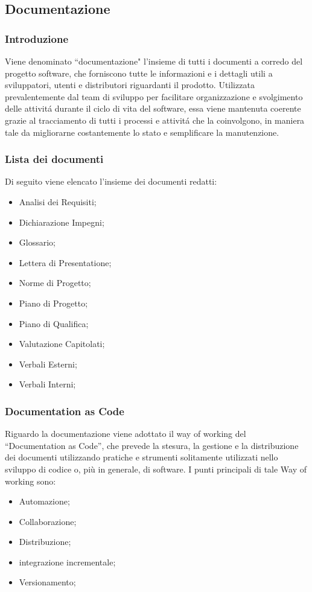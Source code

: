 \subsection{Documentazione}
\subsubsection{Introduzione}
Viene denominato ``documentazione" l'insieme di tutti i documenti a corredo del progetto software, che forniscono tutte le informazioni e i dettagli utili a sviluppatori, utenti e distributori riguardanti il prodotto. Utilizzata prevalentemente dal team di sviluppo per facilitare organizzazione e svolgimento delle attivitá durante il ciclo di vita del software, essa viene mantenuta coerente grazie al tracciamento di tutti i processi e attivitá che la coinvolgono, in maniera tale da migliorarne costantemente lo stato e semplificare la manutenzione.
\subsubsection{Lista dei documenti}
Di seguito viene elencato l'insieme dei documenti redatti:
\begin{itemize}
    \item Analisi dei Requisiti;
    \item Dichiarazione Impegni;
    \item Glossario;
    \item Lettera di Presentatione;
    \item Norme di Progetto;
    \item Piano di Progetto;
    \item Piano di Qualifica;
    \item Valutazione Capitolati;
    \item Verbali Esterni;
    \item Verbali Interni;
\end{itemize}

\subsubsection{Documentation as Code}
Riguardo la documentazione viene adottato il way of working del ``Documentation as Code'', che prevede la stesura, la gestione e la distribuzione dei documenti utilizzando pratiche e strumenti solitamente utilizzati nello sviluppo di codice o, più in generale, di software. I punti principali di tale Way of working sono:
\begin{itemize}
    \item Automazione;
    \item Collaborazione;
    \item Distribuzione;
    \item integrazione incrementale;
    \item Versionamento;
\end{itemize}

